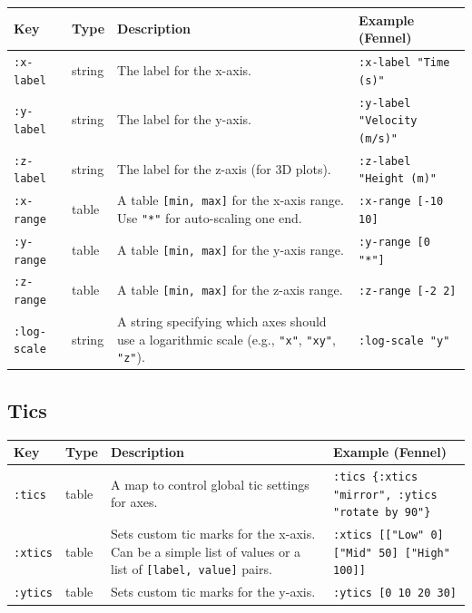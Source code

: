 \documentclass[12pt, letterpaper]{article}
\begin{document}
	\begin{table}[htbp]
		\centering
		\begin{tabularx}{\textwidth}{l l X X}
			\toprule
			\textbf{Key} & \textbf{Type} & \textbf{Description} & \textbf{Example (Fennel)} \\
			\midrule
			\texttt{:x-label} & string & The label for the x-axis. & \texttt{:x-label "Time (s)"} \\
			\texttt{:y-label} & string & The label for the y-axis. & \texttt{:y-label "Velocity (m/s)"} \\
			\texttt{:z-label} & string & The label for the z-axis (for 3D plots). & \texttt{:z-label "Height (m)"} \\
			\texttt{:x-range} & table & A table \texttt{[min, max]} for the x-axis range. Use \texttt{"*"} for auto-scaling one end. & \texttt{:x-range [-10 10]} \\
			\texttt{:y-range} & table & A table \texttt{[min, max]} for the y-axis range. & \texttt{:y-range [0 "*"]} \\
			\texttt{:z-range} & table & A table \texttt{[min, max]} for the z-axis range. & \texttt{:z-range [-2 2]} \\
			\texttt{:log-scale} & string & A string specifying which axes should use a logarithmic scale (e.g., \texttt{"x"}, \texttt{"xy"}, \texttt{"z"}). & \texttt{:log-scale "y"} \\
			\bottomrule
		\end{tabularx}
	\end{table}
	
	\subsection{Tics}
	
	\begin{table}[htbp]
		\centering
		\begin{tabularx}{\textwidth}{l l X X}
			\toprule
			\textbf{Key} & \textbf{Type} & \textbf{Description} & \textbf{Example (Fennel)} \\
			\midrule
			\texttt{:tics} & table & A map to control global tic settings for axes. & \texttt{:tics \{:xtics "mirror", :ytics "rotate by 90"\}} \\
			\texttt{:xtics} & table & Sets custom tic marks for the x-axis. Can be a simple list of values or a list of \texttt{[label, value]} pairs. & \texttt{:xtics [["Low" 0] ["Mid" 50] ["High" 100]]} \\
			\texttt{:ytics} & table & Sets custom tic marks for the y-axis. & \texttt{:ytics [0 10 20 30]} \\
			\bottomrule
		\end{tabularx}
	\end{table}
	
\end{document}
